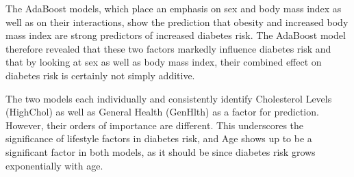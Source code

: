 \documentclass[]{article}
\begin{document}
The AdaBoost models, which place an emphasis on sex and body mass index as well as on their interactions, show the prediction that obesity and increased body mass index are strong predictors of increased diabetes risk. The AdaBoost model therefore revealed that these two factors markedly influence diabetes risk and that by looking at sex as well as body mass index, their combined effect on diabetes risk is certainly not simply additive.

The two models each individually and consistently identify Cholesterol Levels (HighChol) as well as General Health (GenHlth) as a factor for prediction. However, their orders of importance are different. This underscores the significance of lifestyle factors in diabetes risk, and Age shows up to be a significant factor in both models, as it should be since diabetes risk grows exponentially with age.
\pagebreak
\end{document}
